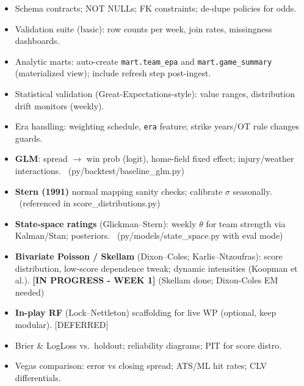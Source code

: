 \begin{itemize}
  \item {} Schema contracts; NOT NULLs; FK constraints; de-dupe policies for odds.
  \item {} Validation suite (basic): row counts per week, join rates, missingness dashboards.
  \item {} Analytic marts: auto-create \texttt{mart.team\_epa} and \texttt{mart.game\_summary} (materialized view); include refresh step post-ingest. \done
  \item {} Statistical validation (Great-Expectations-style): value ranges, distribution drift monitors (weekly).
  \item {} Era handling: weighting schedule, \texttt{era} feature; strike years/OT rule changes guards.
\end{itemize}

\begin{itemize}
  \item {} \textbf{GLM}: spread $\to$ win prob (logit), home-field fixed effect; injury/weather interactions. \done\ (py/backtest/baseline\_glm.py)
  \item {} \textbf{Stern (1991)} normal mapping sanity checks; calibrate $\sigma$ seasonally. \done\ (referenced in score\_distributions.py)
  \item {} \textbf{State-space ratings} (Glickman--Stern): weekly $\theta$ for team strength via Kalman/Stan; posteriors. \done\ (py/models/state\_space.py with eval mode)
  \item {} \textbf{Bivariate Poisson / Skellam} (Dixon--Coles; Karlis--Ntzoufras): score distribution, low-score dependence tweak; dynamic intensities (Koopman et al.). \textbf{[IN PROGRESS - WEEK 1]} (Skellam done; Dixon-Coles EM needed)
  \item {} \textbf{In-play RF} (Lock--Nettleton) scaffolding for live WP (optional, keep modular). [DEFERRED]
\end{itemize}

\begin{itemize}
  \item {} Brier \& LogLoss vs.\ holdout; reliability diagrams; PIT for score distro.
  \item {} Vegas comparison: error vs closing spread; ATS/ML hit rates; CLV differentials.
\end{itemize}

